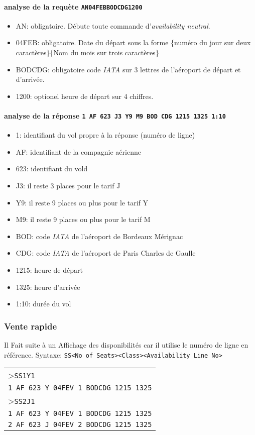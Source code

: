 \documentclass[a4paper,11pt]{article}
\begin{document}
\paragraph{analyse de la requète \texttt{AN04FEBBODCDG1200}}
\begin{itemize}
	\item AN: obligatoire. Débute toute commande d'\textit{availability neutral}.
	\item 04FEB: obligatoire. Date du départ sous la forme \{numéro du jour sur deux caractères\}\{Nom du mois sur trois caractères\}
	\item BODCDG: obligatoire code \textit{IATA} sur 3 lettres de l'aéroport de départ et d'arrivée.
	\item 1200: optionel heure de départ sur 4 chiffres.
\end{itemize}
\paragraph{analyse de la réponse \texttt{1 AF 623 J3 Y9 M9 BOD CDG 1215 1325 1:10}}
\begin{itemize}
	\item 1: identifiant du vol propre à la réponse (numéro de ligne)
	\item AF: identifiant de la compagnie aérienne
	\item 623: identifiant du vold
	\item J3: il reste 3 places pour le tarif J
	\item Y9: il reste 9 places ou plus pour le tarif Y
	\item M9: il reste 9 places ou plus pour le tarif M
	\item BOD: code \textit{IATA} de l'aéroport de Bordeaux Mérignac
	\item CDG: code \textit{IATA} de l'aéroport de Paris Charles de Gaulle
	\item 1215: heure de départ
	\item 1325: heure d'arrivée
	\item 1:10: durée du vol
\end{itemize}
\subsubsection*{Vente rapide}
Il Fait suite à un Affichage des disponibilités car il utilise le numéro de ligne en référence.
Syntaxe: \texttt{SS<No of Seats><Class><Availability Line No>}\\
\begin{centering}
\begin{tabular}{|p{\linewidth}|}
 \hline
>\texttt{SS1Y1} \\	
\texttt{1 AF 623 Y 04FEV 1 BODCDG 1215 1325}\\
>\texttt{SS2J1} \\	
\texttt{1 AF 623 Y 04FEV 1 BODCDG 1215 1325}\\
\texttt{2 AF 623 J 04FEV 2 BODCDG 1215 1325}\\
   \end{tabular}
\end{centering} 
\end{document}
